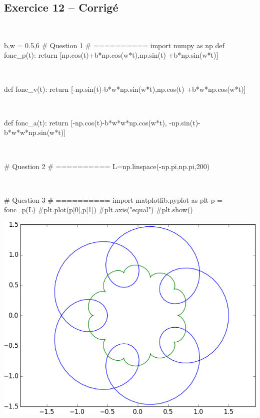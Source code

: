 \documentclass[10pt,fleqn]{article} %
\begin{document}
\begin{multicols}{2}
\columnbreak

\subsection*{Exercice 12 -- Corrigé}

\begin{corrige}
$\quad$
\begin{python}
b,w = 0.5,6
# Question 1 
# ==========
import numpy as np
def fonc_p(t):
    return [np.cos(t)+b*np.cos(w*t),np.sin(t)
    			+b*np.sin(w*t)]
\end{python}
\end{corrige}

\begin{corrige}
$\quad$
\begin{python}
def fonc_v(t):
    return [-np.sin(t)-b*w*np.sin(w*t),np.cos(t)
    			+b*w*np.cos(w*t)]
\end{python}
\end{corrige}

\begin{corrige}
$\quad$
\begin{python}
def fonc_a(t):
    return [-np.cos(t)-b*w*w*np.cos(w*t),
    		 -np.sin(t)-b*w*w*np.sin(w*t)]
\end{python}
\end{corrige}

\begin{corrige}
$\quad$
\begin{python}
# Question 2
# ==========
L=np.linspace(-np.pi,np.pi,200)
\end{python}
\end{corrige}

\begin{corrige}
$\quad$
\begin{python}
# Question 3
# ==========
import matplotlib.pyplot as plt
p = fonc_p(L)
#plt.plot(p[0],p[1])
#plt.axis("equal")
#plt.show()
\end{python}
\end{corrige}

\begin{center}
\includegraphics[width=.8\linewidth]{programmes/Exercice_12/figure_1}
\end{center}


\end{multicols}
\end{document}
